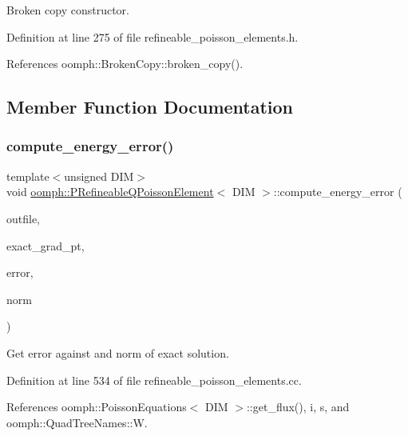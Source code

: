 Broken copy constructor. 



Definition at line 275 of file refineable\+\_\+poisson\+\_\+elements.\+h.



References oomph\+::\+Broken\+Copy\+::broken\+\_\+copy().



\subsection{Member Function Documentation}
\mbox{\label{classoomph_1_1PRefineableQPoissonElement_a9e4b30c3983caf8b74707743d296626f}} 
\subsubsection{\texorpdfstring{compute\+\_\+energy\+\_\+error()}{compute\_energy\_error()}}
{\footnotesize\ttfamily template$<$unsigned D\+IM$>$ \\
void \hyperlink{classoomph_1_1PRefineableQPoissonElement}{oomph\+::\+P\+Refineable\+Q\+Poisson\+Element}$<$ D\+IM $>$\+::compute\+\_\+energy\+\_\+error (\begin{DoxyParamCaption}\item[{std\+::ostream \&}]{outfile,  }\item[{\hyperlink{classoomph_1_1FiniteElement_a690fd33af26cc3e84f39bba6d5a85202}{Finite\+Element\+::\+Steady\+Exact\+Solution\+Fct\+Pt}}]{exact\+\_\+grad\+\_\+pt,  }\item[{double \&}]{error,  }\item[{double \&}]{norm }\end{DoxyParamCaption})}



Get error against and norm of exact solution. 



Definition at line 534 of file refineable\+\_\+poisson\+\_\+elements.\+cc.



References oomph\+::\+Poisson\+Equations$<$ D\+I\+M $>$\+::get\+\_\+flux(), i, s, and oomph\+::\+Quad\+Tree\+Names\+::W.

